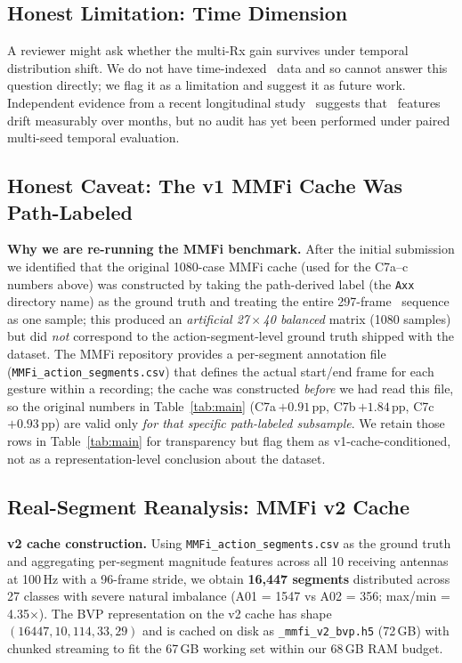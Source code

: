\documentclass[11pt]{article}
\theoremstyle{definition}
\newcommand{\CSI}{\text{CSI}}
\begin{document}
\subsection{Honest Limitation: Time Dimension}

A reviewer might ask whether the multi-Rx gain survives under temporal distribution shift. We do not have time-indexed \CSI\ data and so cannot answer this question directly; we flag it as a limitation and suggest it as future work. Independent evidence from a recent longitudinal study~\cite{vassallo2025time} suggests that \CSI\ features drift measurably over months, but no audit has yet been performed under paired multi-seed temporal evaluation.

\subsection{Honest Caveat: The v1 MMFi Cache Was Path-Labeled}

\textbf{Why we are re-running the MMFi benchmark.} After the initial submission we identified that the original 1080-case MMFi cache (used for the C7a--c numbers above) was constructed by taking the path-derived label (the \texttt{Axx} directory name) as the ground truth and treating the entire 297-frame \CSI\ sequence as one sample; this produced an \emph{artificial 27\,$\times$\,40 balanced} matrix (1080 samples) but did \emph{not} correspond to the action-segment-level ground truth shipped with the dataset. The MMFi repository provides a per-segment annotation file (\texttt{MMFi\_action\_segments.csv}) that defines the actual start/end frame for each gesture within a recording; the cache was constructed \emph{before} we had read this file, so the original numbers in Table~\ref{tab:main} (C7a\,$+0.91$\,pp, C7b\,$+1.84$\,pp, C7c\,$+0.93$\,pp) are valid only \emph{for that specific path-labeled subsample}. We retain those rows in Table~\ref{tab:main} for transparency but flag them as v1-cache-conditioned, not as a representation-level conclusion about the dataset.

\subsection{Real-Segment Reanalysis: MMFi v2 Cache}

\textbf{v2 cache construction.} Using \texttt{MMFi\_action\_segments.csv} as the ground truth and aggregating per-segment magnitude features across all 10 receiving antennas at 100\,Hz with a 96-frame stride, we obtain \textbf{16{,}447 segments} distributed across 27 classes with severe natural imbalance (A01 = 1547 vs A02 = 356; max/min = 4.35$\times$). The BVP representation on the v2 cache has shape $(16447, 10, 114, 33, 29)$ and is cached on disk as \texttt{\_mmfi\_v2\_bvp.h5} (72\,GB) with chunked streaming to fit the 67\,GB working set within our 68\,GB RAM budget.
\end{document}
